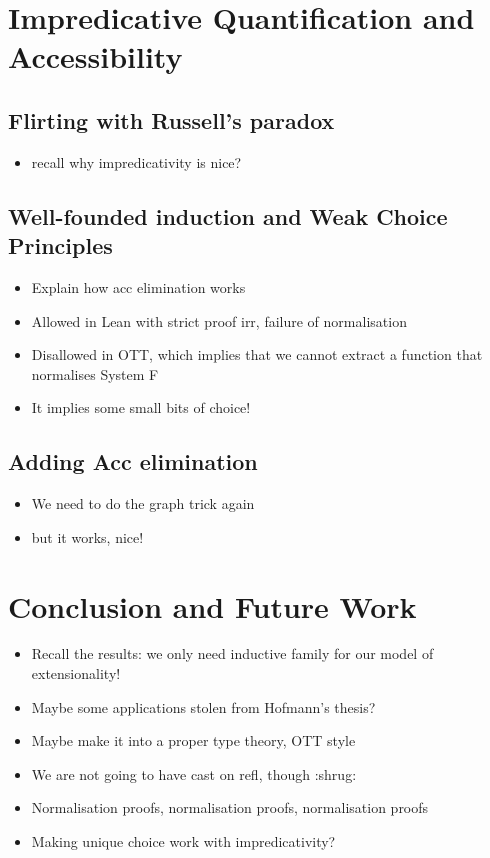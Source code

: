 \documentclass[acmsmall,screen,review]{acmart}
\begin{document}
\section{Impredicative Quantification and Accessibility}

\subsection{Flirting with Russell's paradox}

\begin{itemize}
\item recall why impredicativity is nice?
\end{itemize}

\subsection{Well-founded induction and Weak Choice Principles}

\begin{itemize}
\item Explain how acc elimination works
\item Allowed in Lean with strict proof irr, failure of normalisation
\item Disallowed in OTT, which implies that we cannot extract a function that normalises System F
\item It implies some small bits of choice!
\end{itemize}

\subsection{Adding Acc elimination}

\begin{itemize}
\item We need to do the graph trick again
\item but it works, nice!
\end{itemize}

\section{Conclusion and Future Work}

\begin{itemize}
\item Recall the results: we only need inductive family for our model of extensionality!
\item Maybe some applications stolen from Hofmann's thesis?
\item Maybe make it into a proper type theory, OTT style
\item We are not going to have cast on refl, though :shrug:
\item Normalisation proofs, normalisation proofs, normalisation proofs
\item Making unique choice work with impredicativity?
\end{itemize}


\end{document}
